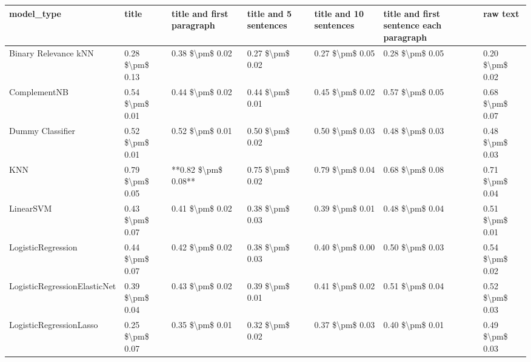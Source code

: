 \begin{tabular}{lllllll}
\toprule
                     model\_type &           title & title and first paragraph & title and 5 sentences & title and 10 sentences & title and first sentence each paragraph &        raw text \\
\midrule
           Binary Relevance kNN & 0.28 \$\textbackslash pm\$ 0.13 &           0.38 \$\textbackslash pm\$ 0.02 &       0.27 \$\textbackslash pm\$ 0.02 &        0.27 \$\textbackslash pm\$ 0.05 &                         0.28 \$\textbackslash pm\$ 0.05 & 0.20 \$\textbackslash pm\$ 0.02 \\
                   ComplementNB & 0.54 \$\textbackslash pm\$ 0.01 &           0.44 \$\textbackslash pm\$ 0.02 &       0.44 \$\textbackslash pm\$ 0.01 &        0.45 \$\textbackslash pm\$ 0.02 &                         0.57 \$\textbackslash pm\$ 0.05 & 0.68 \$\textbackslash pm\$ 0.07 \\
               Dummy Classifier & 0.52 \$\textbackslash pm\$ 0.01 &           0.52 \$\textbackslash pm\$ 0.01 &       0.50 \$\textbackslash pm\$ 0.02 &        0.50 \$\textbackslash pm\$ 0.03 &                         0.48 \$\textbackslash pm\$ 0.03 & 0.48 \$\textbackslash pm\$ 0.03 \\
                            KNN & 0.79 \$\textbackslash pm\$ 0.05 &       **0.82 \$\textbackslash pm\$ 0.08** &       0.75 \$\textbackslash pm\$ 0.02 &        0.79 \$\textbackslash pm\$ 0.04 &                         0.68 \$\textbackslash pm\$ 0.08 & 0.71 \$\textbackslash pm\$ 0.04 \\
                      LinearSVM & 0.43 \$\textbackslash pm\$ 0.07 &           0.41 \$\textbackslash pm\$ 0.02 &       0.38 \$\textbackslash pm\$ 0.03 &        0.39 \$\textbackslash pm\$ 0.01 &                         0.48 \$\textbackslash pm\$ 0.04 & 0.51 \$\textbackslash pm\$ 0.01 \\
             LogisticRegression & 0.44 \$\textbackslash pm\$ 0.07 &           0.42 \$\textbackslash pm\$ 0.02 &       0.38 \$\textbackslash pm\$ 0.03 &        0.40 \$\textbackslash pm\$ 0.00 &                         0.50 \$\textbackslash pm\$ 0.03 & 0.54 \$\textbackslash pm\$ 0.02 \\
   LogisticRegressionElasticNet & 0.39 \$\textbackslash pm\$ 0.04 &           0.43 \$\textbackslash pm\$ 0.02 &       0.39 \$\textbackslash pm\$ 0.01 &        0.41 \$\textbackslash pm\$ 0.02 &                         0.51 \$\textbackslash pm\$ 0.04 & 0.52 \$\textbackslash pm\$ 0.03 \\
        LogisticRegressionLasso & 0.25 \$\textbackslash pm\$ 0.07 &           0.35 \$\textbackslash pm\$ 0.01 &       0.32 \$\textbackslash pm\$ 0.02 &        0.37 \$\textbackslash pm\$ 0.03 &                         0.40 \$\textbackslash pm\$ 0.01 & 0.49 \$\textbackslash pm\$ 0.03 \\

\end{tabular}

